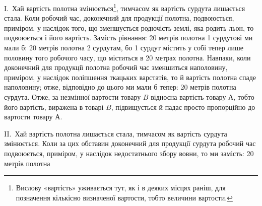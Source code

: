 I.~Хай вартість полотна змінюється\footnote{
Вислову «вартість» уживається тут, як і в деяких місцях раніш,
для позначення кількісно визначеної вартости, тобто величини вартости.
}, тимчасом як вартість
сурдута лишається стала. Коли робочий час, доконечний для продукції
полотна, подвоюється, приміром, у наслідок того, що зменшується
родючість землі, яка родить льон, то подвоюється і його
вартість. Замість рівнання: 20 метрів полотна \deq{} 1 сурдутові ми
мали б: 20 метрів полотна \deq{} 2 сурдутам, бо 1 сурдут містить у
собі тепер лише половину того робочого часу, що міститься в
20 метрах полотна. Навпаки, коли доконечний для продукції
полотна робочий час зменшиться наполовину, приміром, у наслідок
поліпшення ткацьких варстатів, то й вартість полотна спаде
наполовину; отже, відповідно до цього ми мали б тепер: 20 метрів
полотна \deq{}  сурдута. Отже, за незмінної вартости товару $B$
відносна вартість товару $А$, тобто його вартість, виражена в товарі
$B$, підвищується й падає просто пропорційно до вартости
товару $А$.

II.~Хай вартість полотна лишається стала, тимчасом як вартість
сурдута змінюється. Коли за цих обставин доконечний для
продукції сурдута робочий час подвоюється, приміром, у наслідок
недостатнього збору вовни, то ми замість: 20 метрів полотна \deq{}
\parbreak{}  %
